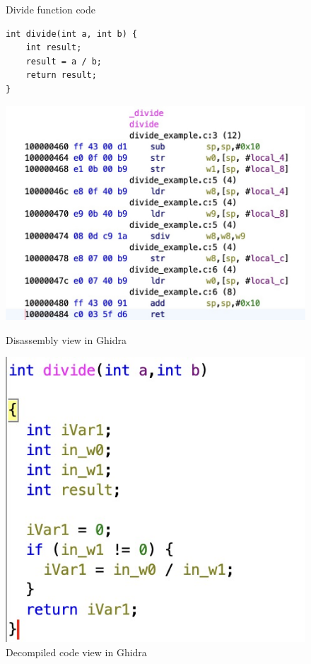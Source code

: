 \begin{figure}[H]
\centering
\begin{minipage}{0.33\textwidth}
\caption{Divide function code}
\begin{lstlisting}
int divide(int a, int b) {
    int result;
    result = a / b;
    return result;
}
\end{lstlisting}
\end{minipage}%
\hfill
\begin{minipage}{0.3\textwidth}
    \centering
    \includegraphics[width=\linewidth]{divide_ghidra.jpeg}
    \caption{Disassembly view in Ghidra}
    \label{fig:ghidra1}
\end{minipage}%
\hfill
\begin{minipage}{0.3\textwidth}
    \centering
    \includegraphics[width=\linewidth]{divide_ghidra2.jpeg}
    \caption{Decompiled code view in Ghidra}
    \label{fig:ghidra2}
\end{minipage}
\end{figure}

